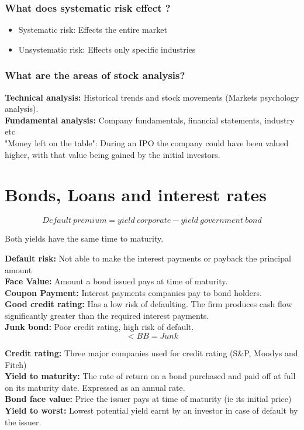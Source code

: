 \documentclass[11pt]{scrartcl} %
\begin{document}
\subsubsection{What does systematic risk effect ?}

\begin{itemize}
	\item Systematic risk: Effects the entire market 
	\item Unsystematic risk: Effects only specific industries
\end{itemize}

\subsubsection{What are the areas of stock analysis?}

\textbf{Technical analysis:} Historical trends and stock movements (Markets psychology analysis).\\
\textbf{Fundamental analysis:} Company fundamentals, financial statements, industry etc \\

"Money left on the table": During an IPO the company could have been valued higher, with that value being gained by the initial investors.

\section{Bonds, Loans and interest rates}

\[ Default\:premium = yield\:corporate - yield\:government\:bond \]

Both yields have the same time to maturity.

\textbf{Default risk:} Not able to make the interest payments or payback the principal amount\\
\textbf{Face Value:} Amount a bond issued pays at time of maturity.\\
\textbf{Coupon Payment:} Interest payments companies pay to bond holders.\\
\textbf{Good credit rating:} Has a low risk of defaulting. The firm produces cash flow significantly greater than the required interest payments.\\
\textbf{Junk bond:} Poor credit rating, high risk of default.\\

\[ < BB = Junk \]

\textbf{Credit rating:} Three major companies used for credit rating (S\&P, Moodys and Fitch)\\
\textbf{Yield to maturity:} The rate of return on a bond purchased and paid off at full on its maturity date. Expressed as an annual rate. \\
\textbf{Bond face value:} Price the issuer pays at time of maturity (ie its initial price)\\
\textbf{Yield to worst:} Lowest potential yield earnt by an investor in case of default by the issuer.
\end{document}

